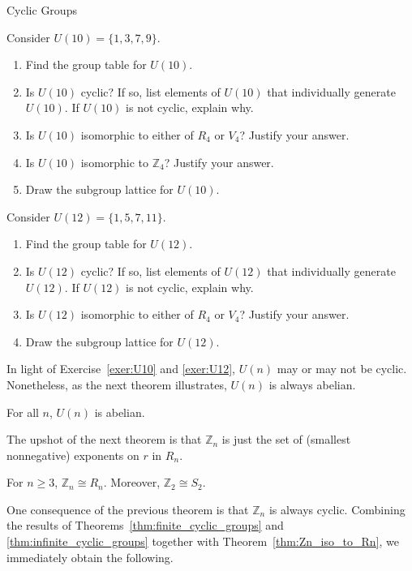 \begin{section}{Cyclic Groups}
\begin{exercise}\label{exer:U10}
Consider $U(10)=\{1,3,7,9\}$.
\begin{enumerate}[label=\rm{(\alph*)}]
\item Find the group table for $U(10)$.
\item Is $U(10)$ cyclic? If so, list elements of $U(10)$ that individually generate $U(10)$.  If $U(10)$ is not cyclic, explain why.
\item Is $U(10)$ isomorphic to either of $R_4$ or $V_4$? Justify your answer.
\item Is $U(10)$ isomorphic to $\mathbb{Z}_4$? Justify your answer.
\item Draw the subgroup lattice for $U(10)$.
\end{enumerate}
\end{exercise}

\begin{exercise}\label{exer:U12}
Consider $U(12)=\{1,5,7,11\}$.
\begin{enumerate}[label=\rm{(\alph*)}]
\item Find the group table for $U(12)$.
\item Is $U(12)$ cyclic? If so, list elements of $U(12)$ that individually generate $U(12)$.  If $U(12)$ is not cyclic, explain why.
\item Is $U(12)$ isomorphic to either of $R_4$ or $V_4$? Justify your answer.
\item Draw the subgroup lattice for $U(12)$.
\end{enumerate}
\end{exercise}

In light of Exercise~\ref{exer:U10} and \ref{exer:U12}, $U(n)$ may or may not be cyclic. Nonetheless, as the next theorem illustrates, $U(n)$ is always abelian.

\begin{theorem}
For all $n$, $U(n)$ is abelian.
\end{theorem}

The upshot of the next theorem is that $\mathbb{Z}_n$ is just the set of (smallest nonnegative) exponents on $r$ in $R_n$.

\begin{theorem}\label{thm:Zn_iso_to_Rn}
For $n\geq 3$, $\mathbb{Z}_n\cong R_n$. Moreover, $\mathbb{Z}_2\cong S_2$.
\end{theorem}

One consequence of the previous theorem is that $\mathbb{Z}_n$ is always cyclic. Combining the results of Theorems~\ref{thm:finite_cyclic_groups} and \ref{thm:infinite_cyclic_groups} together with Theorem~\ref{thm:Zn_iso_to_Rn}, we immediately obtain the following.


\end{section}
